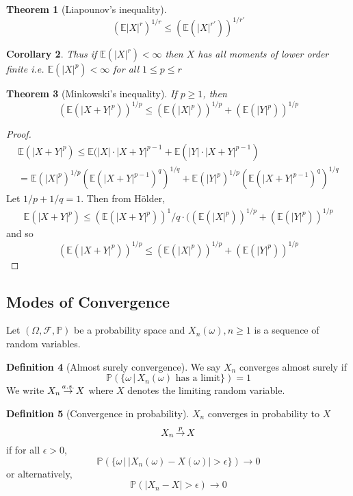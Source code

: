 \documentclass[10pt, oneside, reqno]{amsart}
\theoremstyle{plain}%
\newtheorem{thm}{Theorem}[section]
\newtheorem{cor}[thm]{Corollary}
\theoremstyle{definition}
\newtheorem{defn}[thm]{Definition}
\theoremstyle{remark}
\newcommand{\sigf}{\mathcal{F}}
\newcommand{\E}{\mathbb{E}}
\renewcommand{\P}{\mathbb{P}}
\def\cip{\,{\buildrel p \over \rightarrow}\,}
\def\cas{\,{\buildrel a.s. \over \rightarrow}\,}
\begin{document}
\begin{thm}[Liapounov's inequality]
	\[
		(\E|X|^r)^{1/r} \leq ( \E(|X|^{r'}))^{1/r'}
	\]
\end{thm}
\begin{cor}
	Thus if $\E(|X|^r) < \infty$ then $X$ has all moments of lower order finite i.e. $\E(|X|^p) < \infty$ for all $ 1 \leq p \leq r$
\end{cor}


\begin{thm}[Minkowski's inequality]
	If $p \geq 1$, then \[
		(\E(|X+Y|^p))^{1/p} \leq (\E(|X|^p))^{1/p} + (\E(|Y|^p))^{1/p}
	\]
\end{thm}
\begin{proof}
	\begin{align*}
		\E(|X+Y|^p) \leq \E(|X| \cdot |X+Y|^{p-1} + \E(|Y| \cdot |X+Y|^{p-1}) \\
					= \E(|X|^p)^{1/p} ( \E(|X+Y|^{p-1})^q)^{1/q} + \E(|Y|^p)^{1/p} ( \E(|X+Y|^{p-1})^q)^{1/q}
	\end{align*}
	Let $1/p + 1/q = 1$.  Then from H\"older, 
	\begin{align*}
		\E(|X+Y|^p) \leq (\E(|X+Y|^p))^1/q \cdot ( (\E(|X|^p))^{1/p} + ( \E(|Y|^p))^{1/p}
	\end{align*}
	and so \[
		(\E(|X+Y|^p))^{1/p} \leq (\E(|X|^p))^{1/p} + (\E(|Y|^p))^{1/p}
	\]
\end{proof}

\subsection{Modes of Convergence} %
\label{sub:modes_of_convergence}
Let $(\Omega, \sigf, \P)$ be a probability space and $X_n(\omega), n \geq 1$ is a sequence of random variables.  

\begin{defn}[Almost surely convergence]
	We say $X_n$ converges almost surely if \[
		\P( \{ \omega \, | \, X_n(\omega) \text{ has a limit} \} ) = 1
	\]
	We write $X_n \cas X$ where $X$ denotes the limiting random variable.
\end{defn}

\begin{defn}[Convergence in probability]
	$X_n$ converges in probability to $X$ \[
		X_n \cip X
	\] if for all $\epsilon > 0$, \[
		\P( \{ \omega \, | \, |X_n(\omega) - X(\omega) | > \epsilon \} ) \rightarrow 0
	\]
	or alternatively,\[
		\P( |X_n - X| > \epsilon) \rightarrow 0
	\]
\end{defn}
\end{document}
